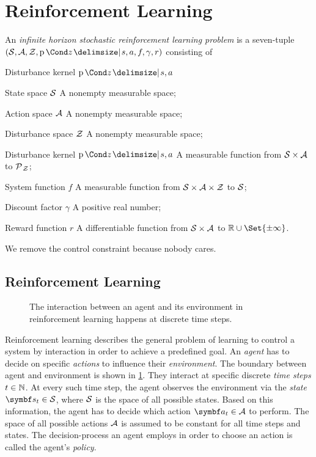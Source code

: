\section{Reinforcement Learning}
\label{sec:reinforcement_learning}
\parencite{bertsekas_stochastic_1978}

\begin{definition}
    An \emph{infinite horizon stochastic reinforcement learning problem} is a seven-tuple $(\Sc, \Ac, \Zc, \Prob{z \given s, a}, f, \gamma, r)$ consisting of
    \begin{labeling}{Disturbance kernel $\Prob{z \given s, a}$\quad}
        \item[State space $\mathcal{S}$] A nonempty measurable space;
        \item[Action space $\mathcal{A}$] A nonempty measurable space;
        \item[Disturbance space $\mathcal{Z}$] A nonempty measurable space;
        \item[Disturbance kernel $\Prob{z \given s, a}$] A measurable function from $\mathcal{S} \times \mathcal{A}$ to $\operatorname{\mathcal{P}\mkern1mu}_{\mathcal{Z}}$;
        \item[System function $f$] A measurable function from  $\mathcal{S} \times \mathcal{A} \times \mathcal{Z}$ to $\mathcal{S}$;
        \item[Discount factor $\gamma$] A positive real number;
        \item[Reward function $r$] A differentiable function from $\mathcal{S} \times \mathcal{A}$ to $\Rb \cup \Set{\pm \infty}$.
    \end{labeling}
\end{definition}
We remove the control constraint because nobody cares.


\subsection{Reinforcement Learning}
\label{sub:reinforcement_learning}
\begin{figure}[t]
    \centering
    
    \caption[Agent-environment interaction]{
        The interaction between an agent and its environment in reinforcement learning happens at discrete time steps.
    }
    \label{fig:agent_environment_interaction}
\end{figure}
Reinforcement learning describes the general problem of learning to control a system by interaction in order to achieve a predefined goal.
An \emph{agent} has to decide on specific \emph{actions} to influence their \emph{environment}.
The boundary between agent and environment is shown in \cref{fig:agent_environment_interaction}.
They interact at specific discrete \emph{time steps} $t \in \mathbb{N}$.
At every such time step, the agent observes the environment via the \emph{state} $\mat{s}_t \in \Sc$, where $\mathcal{S}$ is the space of all possible states.
Based on this information, the agent has to decide which action $\mat{a}_t \in \Ac$ to perform.
The space of all possible actions $\mathcal{A}$ is assumed to be constant for all time steps and states.
The decision-process an agent employs in order to choose an action is called the agent's \emph{policy}.

